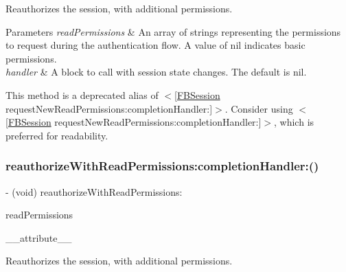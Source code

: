 Reauthorizes the session, with additional permissions.


\begin{DoxyParams}{Parameters}
{\em read\+Permissions} & An array of strings representing the permissions to request during the authentication flow. A value of nil indicates basic permissions.\\
\hline
{\em handler} & A block to call with session state changes. The default is nil.\\
\hline
\end{DoxyParams}
This method is a deprecated alias of $<$\mbox{[}\hyperlink{interfaceFBSession}{F\+B\+Session} request\+New\+Read\+Permissions\+:completion\+Handler\+:\mbox{]}$>$. Consider using $<$\mbox{[}\hyperlink{interfaceFBSession}{F\+B\+Session} request\+New\+Read\+Permissions\+:completion\+Handler\+:\mbox{]}$>$, which is preferred for readability. \mbox{\label{interfaceFBSession_a5c15996bb59afc28460f92645cf6e7f0}} 
\subsubsection{\texorpdfstring{reauthorize\+With\+Read\+Permissions\+:completion\+Handler\+:()}{reauthorizeWithReadPermissions:completionHandler:()}\hspace{0.1cm}{\footnotesize\ttfamily [2/5]}}
{\footnotesize\ttfamily -\/ (void) reauthorize\+With\+Read\+Permissions\+: \begin{DoxyParamCaption}\item[{(N\+S\+Array $\ast$)}]{read\+Permissions }\item[{completionHandler:((deprecated))}]{\+\_\+\+\_\+attribute\+\_\+\+\_\+ }\end{DoxyParamCaption}}

Reauthorizes the session, with additional permissions.


